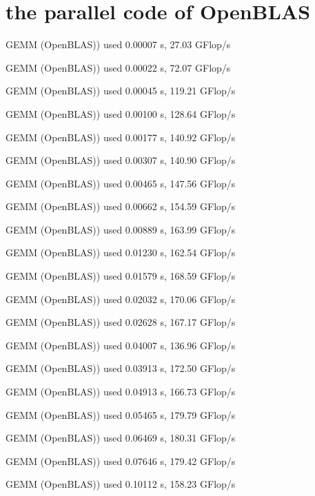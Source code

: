 \documentclass[12pt]{article}
\begin{document}
\section{the parallel code of OpenBLAS}

GEMM (OpenBLAS)) used 0.00007 s, 27.03 GFlop/s

GEMM (OpenBLAS)) used 0.00022 s, 72.07 GFlop/s

GEMM (OpenBLAS)) used 0.00045 s, 119.21 GFlop/s

GEMM (OpenBLAS)) used 0.00100 s, 128.64 GFlop/s

GEMM (OpenBLAS)) used 0.00177 s, 140.92 GFlop/s

GEMM (OpenBLAS)) used 0.00307 s, 140.90 GFlop/s

GEMM (OpenBLAS)) used 0.00465 s, 147.56 GFlop/s

GEMM (OpenBLAS)) used 0.00662 s, 154.59 GFlop/s

GEMM (OpenBLAS)) used 0.00889 s, 163.99 GFlop/s

GEMM (OpenBLAS)) used 0.01230 s, 162.54 GFlop/s

GEMM (OpenBLAS)) used 0.01579 s, 168.59 GFlop/s

GEMM (OpenBLAS)) used 0.02032 s, 170.06 GFlop/s

GEMM (OpenBLAS)) used 0.02628 s, 167.17 GFlop/s

GEMM (OpenBLAS)) used 0.04007 s, 136.96 GFlop/s

GEMM (OpenBLAS)) used 0.03913 s, 172.50 GFlop/s

GEMM (OpenBLAS)) used 0.04913 s, 166.73 GFlop/s

GEMM (OpenBLAS)) used 0.05465 s, 179.79 GFlop/s

GEMM (OpenBLAS)) used 0.06469 s, 180.31 GFlop/s

GEMM (OpenBLAS)) used 0.07646 s, 179.42 GFlop/s

GEMM (OpenBLAS)) used 0.10112 s, 158.23 GFlop/s
\end{document}
